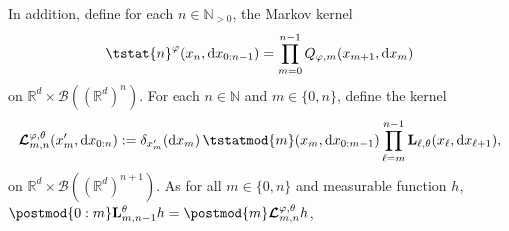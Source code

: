 \documentclass{article}
\newcommand{\Xfd}{\mathcal{X}}
\newcommand{\precpar}{\varphi}
\newcommand{\intvect}[2]{\{ #1, #2 \}}
\newcommand{\nset}{\mathbb{N}}
\newcommand{\nsetpos}{\mathbb{N}_{> 0}}
\newcommand{\1}{\mathbbm{1}}
\newcommand{\retrokmod}{\boldsymbol{\mathcal{L}}^{\precpar,\theta}}
\newcommand{\uk}[1]{\mathbf{L}_{#1}}
\newcommand{\tensprod}{\otimes}
\newcommand{\Xset}{\mathsf{X}}
\newcommand{\parvec}{\theta}
\newcommand{\bmf}[1]{\set{F}(#1)}
\newcommand{\set}[1]{\mathsf{#1}}
\newcommand{\rmd}{\ensuremath{\mathrm{d}}}
\newcommand{\eqdef}{\ensuremath{:=}}
\begin{document}
In addition, define for each $n \in \nsetpos$, the Markov kernel  
$$
\tstat{n}^\varphi(x_n, \rmd x_{0:n - 1}) = \prod_{m = 0}^{n - 1} Q_{\varphi,m}(x_{m + 1}, \rmd x_m)
$$ 
on $\mathbb{R}^d \times \mathcal{B}((\mathbb{R}^d)^n)$. %
    For each $n \in \nset$ and $m \in \intvect{0}{n}$, define the kernel  
\begin{equation} \label{eq:def:retrokmod}
    \retrokmod_{m, n}(x_m', \rmd x_{0:n}) \eqdef \delta_{x_m'}(\rmd x_m) \, \tstatmod{m}(x_m, \rmd x_{0:m - 1}) \prod_{\ell = m}^{n - 1} \uk{\ell,\theta}(x_\ell, \rmd x_{\ell + 1}), 
\end{equation}
on  $\mathbb{R}^d \times \mathcal{B}((\mathbb{R}^d)^{n+1})$. 
As for all $m \in \intvect{0}{n}$ and measurable function $h$, 
 $\postmod{0:m} \uk{m, n - 1}^\theta h = \postmod{m} \retrokmod_{m, n} h$,
\end{document}
